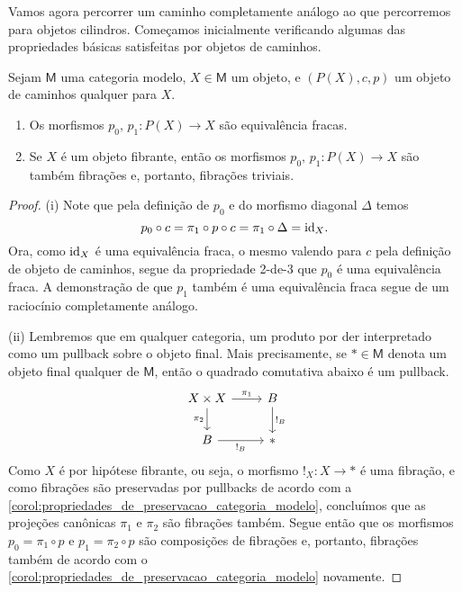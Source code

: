 Vamos agora percorrer um caminho completamente análogo ao que percorremos para objetos cilindros.
Começamos inicialmente verificando algumas das propriedades básicas satisfeitas por objetos de caminhos.

\begin{lema}\label{lema:props_obj_de_caminhos}
  Sejam $\mathsf{M}$ uma categoria modelo, $X \in \mathsf{M}$ um objeto, e $(P(X),c,p)$ um objeto de caminhos qualquer para $X$.
  \begin{enumerate}
  \item[(i)] Os morfismos $p_{0},\, p_{1}: P(X) \to X$ são equivalência fracas.
    
  \item[(ii)] Se $X$ é um objeto fibrante, então os morfismos $p_{0},\, p_{1}: P(X) \to X$ são também fibrações e, portanto, fibrações triviais.
  \end{enumerate}
\end{lema}

\begin{proof}
  (i) Note que pela definição de $p_{0}$ e do morfismo diagonal $\Delta$ temos
  \begin{displaymath}
    p_{0} \circ c = \pi_{1} \circ p \circ c = \pi_{1} \circ \Delta = \mathrm{id}_{X}.
  \end{displaymath}
  Ora, como $\mathrm{id}_{X}$ é uma equivalência fraca, o mesmo valendo para $c$ pela definição de objeto de caminhos, segue da propriedade 2-de-3 que $p_{0}$ é uma equivalência fraca.
  A demonstração de que $p_{1}$ também é uma equivalência fraca segue de um raciocínio completamente análogo.

  \smallskip
  (ii) Lembremos que em qualquer categoria, um produto por der interpretado como um pullback sobre o objeto final.
  Mais precisamente, se $* \in \mathsf{M}$ denota um objeto final qualquer de $\mathsf{M}$, então o quadrado comutativa abaixo é um pullback.
  \begin{displaymath}
    \begin{tikzcd}
      X \times X
      \arrow[r, "\pi_{1}"]
      \arrow[d, "\pi_{2}" swap]
      & B
      \arrow[d, "!_{B}"]
      \\ B
      \arrow[r, "!_{B}" swap]
      & *
    \end{tikzcd}
  \end{displaymath}
  Como $X$ é por hipótese fibrante, ou seja, o morfismo $!_{X}: X \to *$ é uma fibração, e como fibrações são preservadas por pullbacks de acordo com a \cref{corol:propriedades_de_preservacao_categoria_modelo}, concluímos que as projeções canônicas $\pi_{1}$ e $\pi_{2}$ são fibrações também.
  Segue então que os morfismos $p_{0} = \pi_{1} \circ p$ e $p_{1} = \pi_{2} \circ p$ são composições de fibrações e, portanto, fibrações também de acordo com o \cref{corol:propriedades_de_preservacao_categoria_modelo} novamente.
\end{proof}

